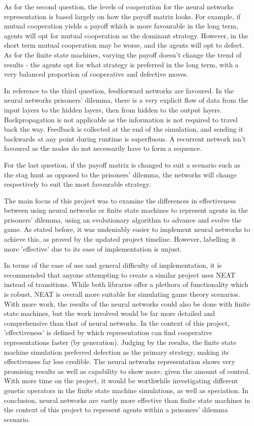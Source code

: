 \documentclass[12pt,a4paper]{article}
\begin{document}
As for the second question, the levels of cooperation for the neural networks representation is based largely on how the payoff matrix looks. For example, if mutual cooperation yields a payoff which is more favourable in the long term, agents will opt for mutual cooperation as the dominant strategy. However, in the short term mutual cooperation may be worse, and the agents will opt to defect. As for the finite state machines, varying the payoff doesn't change the trend of results - the agents opt for what strategy is preferred in the long term, with a very balanced proportion of cooperative and defective moves.

In reference to the third question, feedforward networks are favoured. In the neural networks prisoners' dilemma, there is a very explicit flow of data from the input layers to the hidden layers, then from hidden to the output layers. Backpropagation is not applicable as the information is not required to travel back the way. Feedback is collected at the end of the simulation, and sending it backwards at any point during runtime is superfluous. A recurrent network isn't favoured as the nodes do not necessarily have to form a sequence.

For the last question, if the payoff matrix is changed to suit a scenario such as the stag hunt as opposed to the prisoners' dilemma, the networks will change respectively to suit the most favourable strategy.

The main focus of this project was to examine the differences in effectiveness between using neural networks or finite state machines to represent agents in the prisoners' dilemma, using an evolutionary algorithm to advance and evolve the game. As stated before, it was undeniably easier to implement neural networks to achieve this, as proved by the updated project timeline. However, labelling it more 'effective' due to its ease of implementation is unjust.

In terms of the ease of use and general difficulty of implementation, it is recommended that anyone attempting to create a similar project uses NEAT instead of transitions. While both libraries offer a plethora of functionality which is robust, NEAT is overall more suitable for simulating game theory scenarios. With more work, the results of the neural networks could also be done with finite state machines, but the work involved would be far more detailed and comprehensive than that of neural networks. In the context of this project, 'effectiveness' is defined by which representation can find cooperative representations faster (by generation). Judging by the results, the finite state machine simulation preferred defection as the primary strategy, making its effectiveness far less credible. The neural networks representation shows very promising results as well as capability to show more, given the amount of control. With more time on the project, it would be worthwhile investigating different genetic operators in the finite state machine simulations, as well as speciation. In conclusion, neural networks are vastly more effective than finite state machines in the context of this project to represent agents within a prisoners' dilemma scenario.
\end{document}
